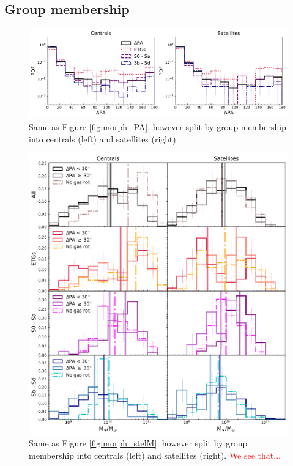 \documentclass[fleqn,usenatbib]{mnras}
\newcommand{\red}[1]{{\textcolor{red}{#1}}}
\begin{document}
\subsection{Group membership}

\begin{figure}
	\includegraphics[width=\linewidth]{cen_sat/delPA_morph_lim.pdf}
    \caption{Same as Figure \ref{fig:morph_PA}, however split by group membership into centrals (left) and satellites (right).}
    \label{fig:group_morph_PA}
\end{figure}

\begin{figure}
	\includegraphics[width=\linewidth]{cen_sat/delPA_stelM_morph_lim.pdf}
    \caption{Same as Figure \ref{fig:morph_stelM}, however split by group membership into centrals (left) and satellites (right). \red{We see that...}}
    \label{fig:group_morph_stelM}
\end{figure}
\end{document}
